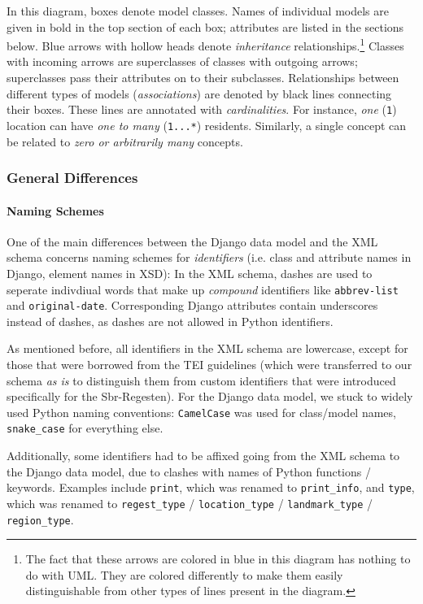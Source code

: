 In this diagram, boxes denote model classes. Names of individual
models are given in bold in the top section of each box; attributes
are listed in the sections below. Blue arrows with hollow heads denote
\emph{inheritance} relationships.\footnote{The fact that these arrows
  are colored in blue in this diagram has nothing to do with UML. They
  are colored differently to make them easily distinguishable from
  other types of lines present in the diagram.} Classes with incoming
arrows are superclasses of classes with outgoing arrows; superclasses
pass their attributes on to their subclasses. Relationships between
different types of models (\emph{associations}) are denoted by black
lines connecting their boxes. These lines are annotated with
\emph{cardinalities}. For instance, \emph{one} (\texttt{1}) location
can have \emph{one to many} (\texttt{1...*}) residents. Similarly, a
single concept can be related to \emph{zero or arbitrarily many}
concepts.

\subsubsection{General Differences}
\label{sec:gen-diff}

\paragraph{Naming Schemes}

One of the main differences between the Django data model and the XML
schema concerns naming schemes for \emph{identifiers} (i.e. class and
attribute names in Django, element names in XSD): In the XML schema,
dashes are used to seperate indivdiual words that make up
\emph{compound} identifiers like \texttt{abbrev-list} and
\texttt{original-date}. Corresponding Django attributes contain
underscores instead of dashes, as dashes are not allowed in Python
identifiers.

As mentioned before, all identifiers in the XML schema are lowercase,
except for those that were borrowed from the TEI guidelines (which
were transferred to our schema \emph{as is} to distinguish them from
custom identifiers that were introduced specifically for the
Sbr-Regesten). For the Django data model, we stuck to widely used
Python naming conventions: \texttt{CamelCase} was used for class/model
names, \texttt{snake\_case} for everything else.

Additionally, some identifiers had to be affixed going from the XML
schema to the Django data model, due to clashes with names of Python
functions / keywords. Examples include \texttt{print}, which was
renamed to \texttt{print\_info}, and \texttt{type}, which was renamed
to \texttt{regest\_type} / \texttt{location\_type} /
\texttt{landmark\_type} / \texttt{region\_type}.

